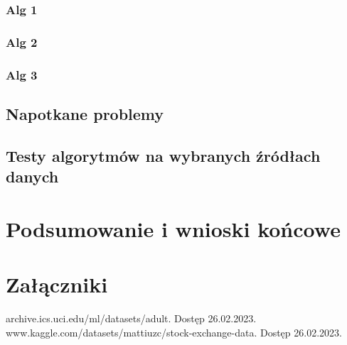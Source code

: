 \documentclass[12pt,twoside]{article}
\begin{document}
\subsubsection{Alg 1}
\subsubsection{Alg 2}
\subsubsection{Alg 3}
\subsection{Napotkane problemy}
\subsection{Testy algorytmów na wybranych źródłach danych}
\clearpage


\section{Podsumowanie i wnioski końcowe}

\clearpage


\section*{Załączniki}


\clearpage



\begin{thebibliography}{4}
     archive.ics.uci.edu/ml/datasets/adult. Dostęp 26.02.2023.
     www.kaggle.com/datasets/mattiuzc/stock-exchange-data. Dostęp 26.02.2023.
\end{thebibliography}

\clearpage


\makesummary
\end{document}
